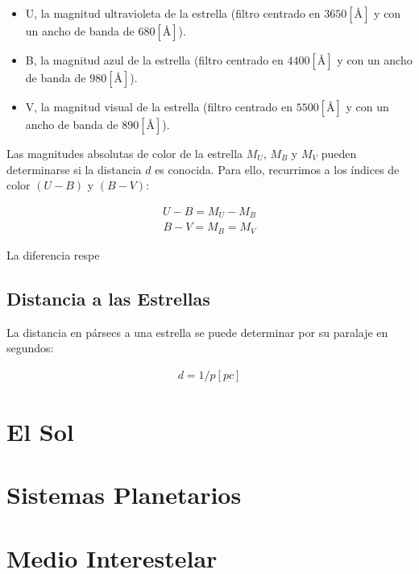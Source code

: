 \documentclass{tufte-handout}
\begin{document}
\begin{itemize}
  \item U, la magnitud ultravioleta de la estrella (filtro centrado en $3650 [\si{\angstrom}]$ y con un ancho de banda de $680 [\si{\angstrom}]$).
  \item B, la magnitud azul de la estrella (filtro centrado en $4400 [\si{\angstrom}]$ y con un ancho de banda de $980 [\si{\angstrom}]$).
  \item V, la magnitud visual de la estrella (filtro centrado en $5500 [\si{\angstrom}]$ y con un ancho de banda de $890 [\si{\angstrom}]$).
\end{itemize}

Las magnitudes absolutas de color de la estrella $M_U$, $M_B$ y $M_V$ pueden determinarse si la distancia $d$ es conocida. Para ello, recurrimos a los índices de color $(U-B)$ y $(B-V)$:

\begin{align}
  U - B = M_U - M_B
\end{align}
\begin{align}
  B - V = M_B = M_V
\end{align}

La diferencia respe

\subsection{Distancia a las Estrellas}

La distancia en pársecs a una estrella se puede determinar por su paralaje en segundos:

\begin{align}
  d = 1 / p [pc]
\end{align}

\clearpage

\section{El Sol}

\clearpage

\section{Sistemas Planetarios}

\clearpage

\section{Medio Interestelar}
\end{document}
